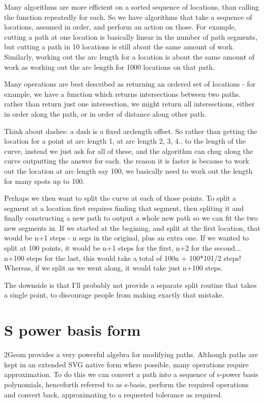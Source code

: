 Many algorithms are more efficient on a sorted sequence of locations,
than calling the function repeatedly for each.  So we have algorithms
that take a sequence of locations, assumed in order, and perform an
action on those.  For example, cutting a path at one location is
basically linear in the number of path segments, but cutting a path in
10 locations is still about the same amount of work.  Similarly,
working out the arc length for a location is about the same amount of
work as working out the arc length for 1000 locations on that path.

Many operations are best described as returning an ordered set of
locations - for example, we have a function which returns
intersections between two paths.  rather than return just one
intersection, we might return all intersections, either in order along
the path, or in order of distance along other path.

Think about dashes: a dash is a fixed arclength offset.  So rather
than getting the location for a point at arc length 1, at arc length
2, 3, 4.. to the length of the curve, instead we just ask for all of
these, and the algorithm can chug along the curve outputting the
answer for each.  the reason it is faster is because to work out the
location at arc length say 100, we basically need to work out the
length for many spots up to 100.

Perhaps we then want to split the curve at each of those points.  To
split a segment at a location first requires finding that segment,
then spliting it and finally constructing a new path to output a whole
new path so we can fit the two new segments in.  If we started at the
begining, and split at the first location, that would be n+1 steps - n
segs in the original, plus an extra one.  If we wanted to split at 100
points, it would be n+1 steps for the first, n+2 for the
second... n+100 steps for the last, this would take a total of 100n +
100*101/2 steps!  Whereas, if we split as we went along, it would take
just n+100 steps.

The downside is that I'll probably not provide a separate split
routine that takes a single point, to discourage people from making
exactly that mistake.

\section{S power basis form}

2Geom provides a very powerful algebra for modifying paths.  Although
paths are kept in an extended SVG native form where possible, many
operations require approximation.  To do this we can convert a path
into a sequence of s-power basis polynomials, henceforth referred to
as s-basis, perform the required operations and convert back,
approximating to a requested tolerance as required.

